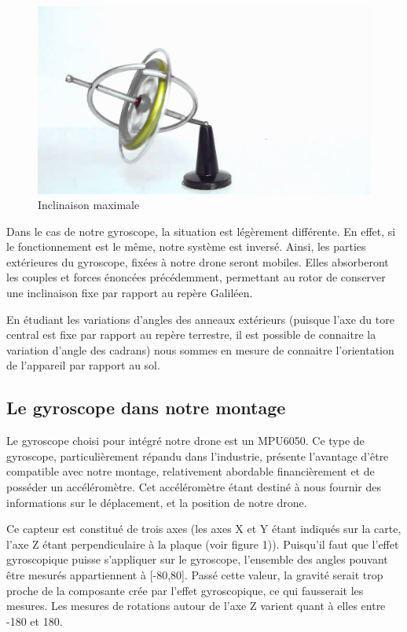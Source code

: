 \documentclass[a4paper,10pt]{report}
\begin{document}
	  \begin{figure}[htbp]
	    \centering
	    \includegraphics[scale = 0.2]{img/inclinaison.jpg}
	    \caption{Inclinaison maximale}
	    \label{inclinaisonmax}
	  \end{figure}
	  
	  Dans le cas de notre gyroscope, la situation est légèrement 
différente. En effet, si le fonctionnement est le même, notre système est 
inversé. Ainsi, les parties extérieures du gyroscope, fixées à notre drone 
seront mobiles. Elles absorberont les couples et forces énoncées précédemment, 
permettant au rotor de conserver une inclinaison fixe par rapport au repère 
Galiléen.

	  En étudiant les variations d'angles des anneaux extérieurs (puisque 
l'axe du tore central est fixe par rapport au repère terrestre, il est possible 
de connaitre la variation d'angle des cadrans) nous sommes en mesure de 
connaitre l'orientation de l'appareil par rapport au sol.

	\subsection{Le gyroscope dans notre montage}
	  Le gyroscope choisi pour intégré notre drone est un MPU6050. Ce type 
de gyroscope, particulièrement répandu dans l'industrie, présente l'avantage 
d'être compatible avec notre montage, relativement abordable financièrement et 
de posséder un accéléromètre. Cet accéléromètre étant destiné à nous fournir 
des informations sur le déplacement, et la position de notre drone. 
 
	  Ce capteur est constitué de trois axes (les axes X et Y étant 
indiqués sur la carte, l'axe Z étant perpendiculaire à la plaque (voir figure 
1)). Puisqu'il faut que l'effet gyroscopique puisse s'appliquer sur le 
gyroscope, l'ensemble des angles pouvant être mesurés appartiennent à [-80,80]. 
Passé cette valeur, la gravité serait trop proche de la composante crée par 
l'effet gyroscopique, ce qui fausserait les mesures. Les mesures de rotations 
autour de l'axe Z varient quant à elles entre -180 et 180.
\end{document}
